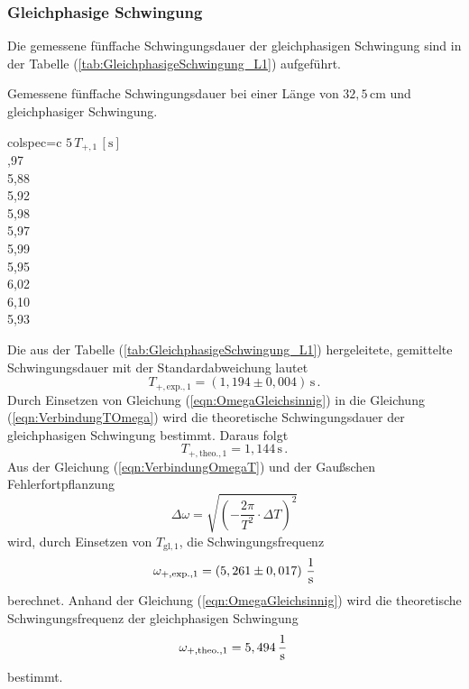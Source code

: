 \subsubsection{Gleichphasige Schwingung}
\label{sec:GleichphasigeSchwingung_KuresPendel}
Die gemessene fünffache Schwingungsdauer der gleichphasigen Schwingung sind in der Tabelle (\ref{tab:GleichphasigeSchwingung_L1}) aufgeführt.
\begin{table}[H]
  \centering
  \caption{Gemessene fünffache Schwingungsdauer bei einer Länge von $32,5\, \unit{\centi\meter}$ und gleichphasiger Schwingung.}
  \label{tab:GleichphasigeSchwingung_L1}
  \begin{tblr}{colspec={c}}
      \toprule
      $5\, T_{+, 1}\,\left[\unit{\second}\right]$\\
      ,97 \\
      5,88 \\
      5,92 \\
      5,98 \\
      5,97 \\
      5,99 \\
      5,95 \\
      6,02 \\
      6,10 \\
      5,93 \\
      \bottomrule
  \end{tblr}
\end{table}
Die aus der Tabelle (\ref{tab:GleichphasigeSchwingung_L1}) hergeleitete, gemittelte Schwingungsdauer mit der Standardabweichung lautet
$$T_{+,\text{exp.}, 1} = \left( 1,194 \pm 0,004 \right)\,\unit{\second}\,.$$
Durch Einsetzen von Gleichung (\ref{eqn:OmegaGleichsinnig}) in die Gleichung (\ref{eqn:VerbindungTOmega}) wird die theoretische Schwingungsdauer der gleichphasigen Schwingung bestimmt. Daraus folgt
$$T_{+, \text{theo.}, 1} = 1,144\,\unit{\second}\,.$$
Aus der Gleichung (\ref{eqn:VerbindungOmegaT}) und der Gaußschen Fehlerfortpflanzung 
$$\Delta \omega = \sqrt{\left(-\frac{2 \pi}{T^{2}}\cdot \Delta T \right)^{2}}$$
wird, durch Einsetzen von $T_{\text{gl}, 1}$, die Schwingungsfrequenz
$$\omega_{+,\text{exp.}, 1} =  \left( 5,261 \pm 0,017 \right)\,\unit[per-mode=fraction]{\per \second}$$ berechnet. 
Anhand der Gleichung (\ref{eqn:OmegaGleichsinnig}) wird die theoretische Schwingungsfrequenz der gleichphasigen Schwingung 
$$\omega_{+, \text{theo.}, 1} = 5,494\,\unit[per-mode=fraction]{\per \second}\,$$ bestimmt.
%
%
